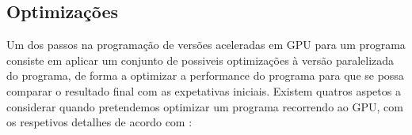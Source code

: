 

\subsection{Optimizações}
\label{optmi}
Um dos passos na programação de versões aceleradas em GPU para um programa consiste em aplicar um conjunto de possiveis optimizações à versão paralelizada do programa, de forma a optimizar a performance do programa para que se possa comparar o resultado final com as expetativas iniciais.
Existem quatros aspetos a considerar quando pretendemos optimizar um programa recorrendo ao GPU, com os respetivos detalhes de acordo com \cite{cudaProgGuide}:
